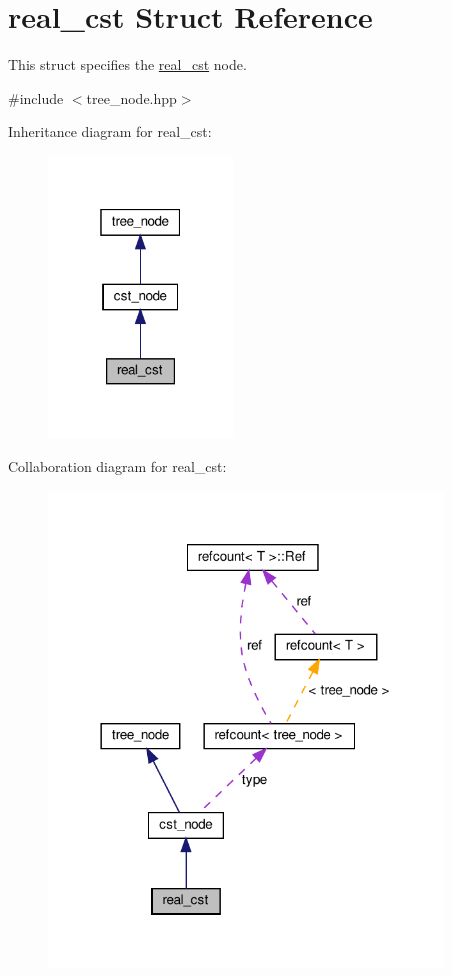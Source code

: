 \hypertarget{structreal__cst}{}\section{real\+\_\+cst Struct Reference}
\label{structreal__cst}


This struct specifies the \hyperlink{structreal__cst}{real\+\_\+cst} node.  




{\ttfamily \#include $<$tree\+\_\+node.\+hpp$>$}



Inheritance diagram for real\+\_\+cst\+:
\nopagebreak
\begin{figure}[H]
\begin{center}
\leavevmode
\includegraphics[width=139pt]{d3/d4f/structreal__cst__inherit__graph}
\end{center}
\end{figure}


Collaboration diagram for real\+\_\+cst\+:
\nopagebreak
\begin{figure}[H]
\begin{center}
\leavevmode
\includegraphics[width=297pt]{d5/d2f/structreal__cst__coll__graph}
\end{center}
\end{figure}
